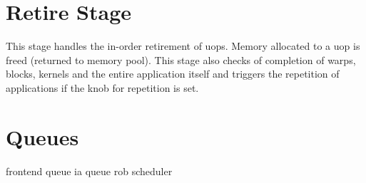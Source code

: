 \section{Retire Stage}

This stage handles the in-order retirement of uops. Memory allocated to a uop
is freed (returned to memory pool). This stage also checks of completion of
warps, blocks, kernels and the entire application itself and triggers the
repetition of applications if the knob for repetition is set.


\section{Queues}

frontend queue
ia queue
rob
scheduler



